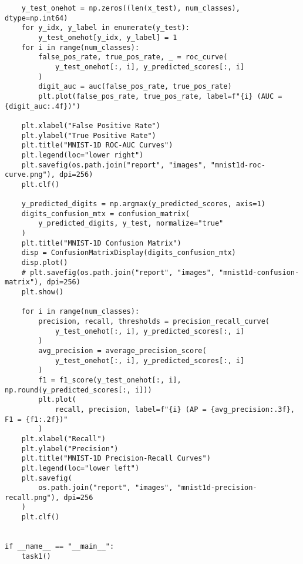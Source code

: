 \documentclass{article}
\begin{document}
\begin{lstlisting}
    y_test_onehot = np.zeros((len(x_test), num_classes), dtype=np.int64)
    for y_idx, y_label in enumerate(y_test):
        y_test_onehot[y_idx, y_label] = 1
    for i in range(num_classes):
        false_pos_rate, true_pos_rate, _ = roc_curve(
            y_test_onehot[:, i], y_predicted_scores[:, i]
        )
        digit_auc = auc(false_pos_rate, true_pos_rate)
        plt.plot(false_pos_rate, true_pos_rate, label=f"{i} (AUC = {digit_auc:.4f})")

    plt.xlabel("False Positive Rate")
    plt.ylabel("True Positive Rate")
    plt.title("MNIST-1D ROC-AUC Curves")
    plt.legend(loc="lower right")
    plt.savefig(os.path.join("report", "images", "mnist1d-roc-curve.png"), dpi=256)
    plt.clf()

    y_predicted_digits = np.argmax(y_predicted_scores, axis=1)
    digits_confusion_mtx = confusion_matrix(
        y_predicted_digits, y_test, normalize="true"
    )
    plt.title("MNIST-1D Confusion Matrix")
    disp = ConfusionMatrixDisplay(digits_confusion_mtx)
    disp.plot()
    # plt.savefig(os.path.join("report", "images", "mnist1d-confusion-matrix"), dpi=256)
    plt.show()

    for i in range(num_classes):
        precision, recall, thresholds = precision_recall_curve(
            y_test_onehot[:, i], y_predicted_scores[:, i]
        )
        avg_precision = average_precision_score(
            y_test_onehot[:, i], y_predicted_scores[:, i]
        )
        f1 = f1_score(y_test_onehot[:, i], np.round(y_predicted_scores[:, i]))
        plt.plot(
            recall, precision, label=f"{i} (AP = {avg_precision:.3f}, F1 = {f1:.2f})"
        )
    plt.xlabel("Recall")
    plt.ylabel("Precision")
    plt.title("MNIST-1D Precision-Recall Curves")
    plt.legend(loc="lower left")
    plt.savefig(
        os.path.join("report", "images", "mnist1d-precision-recall.png"), dpi=256
    )
    plt.clf()


if __name__ == "__main__":
    task1()
\end{lstlisting}

\small


\end{document}
